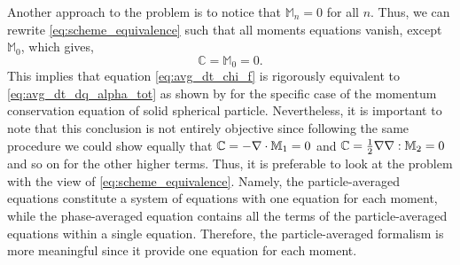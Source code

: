 
Another approach to the problem is to notice that $\mathbb{M}_n=0$ for all $n$. Thus, we can rewrite \ref{eq:scheme_equivalence} such that all moments equations vanish, except $\mathbb{M}_0$, which gives, 
\begin{equation}
    \mathbb{C} = \mathbb{M}_0 = 0.
\end{equation}
This implies that equation \ref{eq:avg_dt_chi_f} is rigorously equivalent to \ref{eq:avg_dt_dq_alpha_tot} as shown by \cite[Appendix A]{nott2011suspension} for the specific case of the momentum conservation equation of solid spherical particle.
Nevertheless, it is important to note that this conclusion is not entirely objective since following the same procedure we could show equally that $\mathbb{C} = -\mathbf{\nabla}\cdot\mathbb{M}_1=0$ and $\mathbb{C} = \frac{1}{2}\mathbf{\nabla}\mathbf{\nabla}:\mathbb{M}_2=0$ and so on for the other higher terms. 
Thus, it is preferable to look at the problem with the view of \ref{eq:scheme_equivalence}. 
Namely, the particle-averaged equations constitute a system of equations with one equation for each moment, while the phase-averaged equation contains all the terms of the particle-averaged equations within a single equation.
Therefore, the particle-averaged formalism is more meaningful since it provide one equation for each moment. 

%

